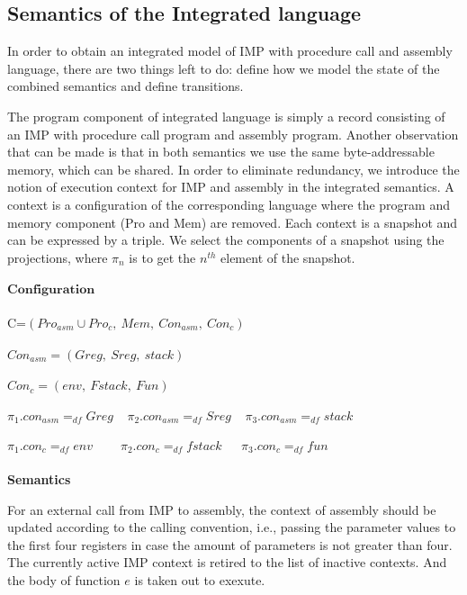 \documentclass[letterpaper, 10 pt, conference]{IEEEtran}
\begin{document}
\subsection{Semantics of the Integrated language}
\par In order to obtain an integrated model of IMP with procedure call and assembly language, there are two things left to
do: define how we model the state of the combined semantics and define transitions.
\par The program component of integrated language is simply a record consisting of an IMP with procedure call program and assembly program. Another observation that can be made is that in both
semantics we use the same byte-addressable memory, which can be shared. In order to eliminate redundancy, we introduce the notion of execution context for IMP and assembly in the integrated semantics.  A context is a configuration of the corresponding language
where the program and memory component (Pro and Mem) are removed. Each context is a snapshot and can be expressed by a triple. We select the components of a snapshot using the projections, where $\pi_n$ is to get the $n^{th}$ element of the snapshot.\\ \\
$\textbf{Configuration}$\\ \\
C=$(Pro_{asm}\cup Pro_c,~Mem,~Con_{asm},~Con_{c})$\\ \\
$Con_{asm}=(Greg,~Sreg,~stack)$\\ \\
$Con_c=(env,~Fstack,~Fun)$\\ \\
$\pi_1.con_{asm}=_{df}Greg~~~~~\pi_2.con_{asm}=_{df}Sreg~~~~~\pi_3.con_{asm}=_{df}stack$\\ \\
$\pi_1.con_c=_{df}env~~~~~~~~~~\pi_2.con_c=_{df}fstack~~~~~~~\pi_3.con_c=_{df}fun$\\ \\
\textbf{Semantics}\\
\par For an external call from IMP to assembly, the context of assembly should be updated according to the calling convention, i.e., passing the parameter values to the first four registers in case the amount of parameters is not greater than four. The currently
active IMP context is retired to the list of inactive contexts. And the body of function $e$ is taken out to exexute.\\ \\
\end{document}
